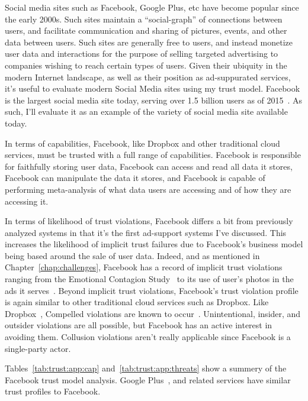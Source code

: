 Social media sites such as Facebook, Google Plus, etc have become
popular since the early 2000s. Such sites maintain a ``social-graph''
of connections between users, and facilitate communication and sharing
of pictures, events, and other data between users. Such sites are
generally free to users, and instead monetize user data and
interactions for the purpose of selling targeted advertising to
companies wishing to reach certain types of users. Given their
ubiquity in the modern Internet landscape, as well as their position
as ad-suppurated services, it's useful to evaluate modern Social Media
sites using my trust model. Facebook is the largest social media site
today, serving over 1.5 billion users as of 2015~\cite{foster2014}. As
such, I'll evaluate it as an example of the variety of social media
site available today.

In terms of capabilities, Facebook, like Dropbox and other traditional
cloud services, must be trusted with a full range of
capabilities. Facebook is responsible for faithfully storing user
data, Facebook can access and read all data it stores, Facebook can
manipulate the data it stores, and Facebook is capable of performing
meta-analysis of what data users are accessing and of how they are
accessing it.

In terms of likelihood of trust violations, Facebook differs a bit
from previously analyzed systems in that it's the first ad-support
systems I've discussed. This increases the likelihood of implicit
trust failures due to Facebook's business model being based around the
sale of user data. Indeed, and as mentioned in
Chapter~\ref{chap:challenges}, Facebook has a record of implicit trust
violations ranging from the Emotional Contagion Study~\cite{goel2014}
to its use of user's photos in the ads it
serves~\cite{mashable-socialads}. Beyond implicit trust violations,
Facebook's trust violation profile is again similar to other
traditional cloud services such as Dropbox. Like
Dropbox~\cite{dropbox-transparency}, Compelled violations are known to
occur~\cite{facebook-transparency}. Unintentional, insider, and
outsider violations are all possible, but Facebook has an active
interest in avoiding them. Collusion violations aren't really
applicable since Facebook is a single-party actor.

Tables~\ref{tab:trust:app:cap} and~\ref{tab:trust:app:threats} show a
summery of the Facebook trust model analysis. Google
Plus~\cite{google-plus}, and related services have similar trust
profiles to Facebook.

